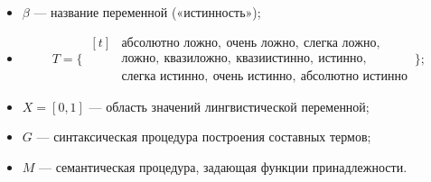 \begin{itemize}
  \item $\beta$ — название переменной («истинность»);
  \item \[ T = \bigl\{\,
      \begin{aligned}[t]
        &\text{абсолютно ложно},\ \text{очень ложно},\ \text{слегка ложно},\\
        &\text{ложно},\ \text{квазиложно},\ \text{квазиистинно},\ \text{истинно},\\
        &\text{слегка истинно},\ \text{очень истинно},\ \text{абсолютно истинно}
      \end{aligned}
  \,\bigr\};
\]
  \item $X = [0,1]$ — область значений лингвистической переменной;
  \item $G$ — синтаксическая процедура построения составных термов;
  \item $M$ — семантическая процедура, задающая функции принадлежности.
\end{itemize}

